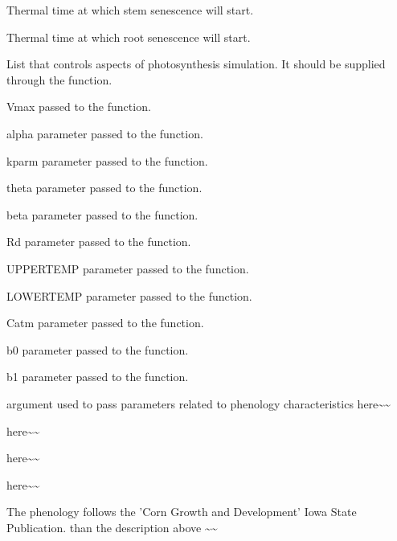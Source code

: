 \documentclass[letterpaper]{book}
\begin{document}
\begin{Arguments}
\begin{ldescription}
 Thermal time at which stem senescence will
start.

 Thermal time at which root senescence will
start.

\item[\code{photoControl}] List that controls aspects of
photosynthesis simulation. It should be supplied through
the  function.

 Vmax passed to the 
function.

 alpha parameter passed to the
 function.

 kparm parameter passed to the
 function.

 theta parameter passed to the
 function.

 beta parameter passed to the
 function.

 Rd parameter passed to the
 function.

 UPPERTEMP parameter passed to the
 function.

 LOWERTEMP parameter passed to the
 function.

 Catm parameter passed to the
 function.

 b0 parameter passed to the
 function.

 b1 parameter passed to the
 function.

\item[\code{MaizePhenoControl}] argument used to pass parameters
related to phenology characteristics 
 here\textasciitilde{}\textasciitilde{}

\item[\code{soilControl}] 
here\textasciitilde{}\textasciitilde{}

\item[\code{nitroControl}] 
here\textasciitilde{}\textasciitilde{}

\item[\code{centuryControl}] 
here\textasciitilde{}\textasciitilde{}
\end{ldescription}
\end{Arguments}
%
\begin{Details}\relax
The phenology follows the 'Corn Growth and Development'
Iowa State Publication. 
than the description above \textasciitilde{}\textasciitilde{}
\end{Details}
\end{document}

